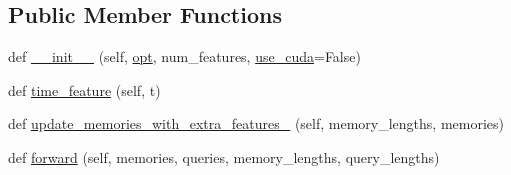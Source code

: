 \subsection*{Public Member Functions}
\begin{DoxyCompactItemize}
\item 
def \hyperlink{classparlai_1_1agents_1_1legacy__agents_1_1memnn_1_1modules__v0_1_1MemNN_a31358714b5f07c4d040a1ed649eb5bc1}{\+\_\+\+\_\+init\+\_\+\+\_\+} (self, \hyperlink{classparlai_1_1agents_1_1legacy__agents_1_1memnn_1_1modules__v0_1_1MemNN_ab39560751f2c13da93f438dfbe90a66a}{opt}, num\+\_\+features, \hyperlink{classparlai_1_1agents_1_1legacy__agents_1_1memnn_1_1modules__v0_1_1MemNN_a65fdd2bb8f070a9eb8b59698b814640c}{use\+\_\+cuda}=False)
\item 
def \hyperlink{classparlai_1_1agents_1_1legacy__agents_1_1memnn_1_1modules__v0_1_1MemNN_ab1188b15b34f67153ac59258d646397b}{time\+\_\+feature} (self, t)
\item 
def \hyperlink{classparlai_1_1agents_1_1legacy__agents_1_1memnn_1_1modules__v0_1_1MemNN_a9da6ab125898ee1ab3744ee5d260b6dd}{update\+\_\+memories\+\_\+with\+\_\+extra\+\_\+features\+\_\+} (self, memory\+\_\+lengths, memories)
\item 
def \hyperlink{classparlai_1_1agents_1_1legacy__agents_1_1memnn_1_1modules__v0_1_1MemNN_ada4f6a93ff12e96bd84ccdefc40535bd}{forward} (self, memories, queries, memory\+\_\+lengths, query\+\_\+lengths)
\end{DoxyCompactItemize}
